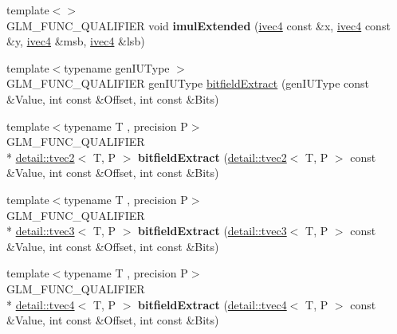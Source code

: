 \begin{DoxyCompactItemize}
\item 
\hypertarget{namespaceglm_a8aa66966beaab138702abc4f469b9839}{{\footnotesize template$<$$>$ }\\G\-L\-M\-\_\-\-F\-U\-N\-C\-\_\-\-Q\-U\-A\-L\-I\-F\-I\-E\-R void {\bfseries imul\-Extended} (\hyperlink{group__core__types_gaa4560ddc50320ea8f8a70d5c9c249fea}{ivec4} const \&x, \hyperlink{group__core__types_gaa4560ddc50320ea8f8a70d5c9c249fea}{ivec4} const \&y, \hyperlink{group__core__types_gaa4560ddc50320ea8f8a70d5c9c249fea}{ivec4} \&msb, \hyperlink{group__core__types_gaa4560ddc50320ea8f8a70d5c9c249fea}{ivec4} \&lsb)}\label{namespaceglm_a8aa66966beaab138702abc4f469b9839}

\item 
{\footnotesize template$<$typename gen\-I\-U\-Type $>$ }\\G\-L\-M\-\_\-\-F\-U\-N\-C\-\_\-\-Q\-U\-A\-L\-I\-F\-I\-E\-R gen\-I\-U\-Type \hyperlink{group__core__func__integer_ga251d309beb171bf95117d2c301b2ad8b}{bitfield\-Extract} (gen\-I\-U\-Type const \&Value, int const \&Offset, int const \&Bits)
\item 
\hypertarget{namespaceglm_ab80cbec6661f19566dafe4d23f997dee}{{\footnotesize template$<$typename T , precision P$>$ }\\G\-L\-M\-\_\-\-F\-U\-N\-C\-\_\-\-Q\-U\-A\-L\-I\-F\-I\-E\-R \\*
\hyperlink{structglm_1_1detail_1_1tvec2}{detail\-::tvec2}$<$ T, P $>$ {\bfseries bitfield\-Extract} (\hyperlink{structglm_1_1detail_1_1tvec2}{detail\-::tvec2}$<$ T, P $>$ const \&Value, int const \&Offset, int const \&Bits)}\label{namespaceglm_ab80cbec6661f19566dafe4d23f997dee}

\item 
\hypertarget{namespaceglm_adcf06c42671bc9aeba477920df26c02e}{{\footnotesize template$<$typename T , precision P$>$ }\\G\-L\-M\-\_\-\-F\-U\-N\-C\-\_\-\-Q\-U\-A\-L\-I\-F\-I\-E\-R \\*
\hyperlink{structglm_1_1detail_1_1tvec3}{detail\-::tvec3}$<$ T, P $>$ {\bfseries bitfield\-Extract} (\hyperlink{structglm_1_1detail_1_1tvec3}{detail\-::tvec3}$<$ T, P $>$ const \&Value, int const \&Offset, int const \&Bits)}\label{namespaceglm_adcf06c42671bc9aeba477920df26c02e}

\item 
\hypertarget{namespaceglm_a7ac7cf2ac2cacd15c4dc19ef3e69fc07}{{\footnotesize template$<$typename T , precision P$>$ }\\G\-L\-M\-\_\-\-F\-U\-N\-C\-\_\-\-Q\-U\-A\-L\-I\-F\-I\-E\-R \\*
\hyperlink{structglm_1_1detail_1_1tvec4}{detail\-::tvec4}$<$ T, P $>$ {\bfseries bitfield\-Extract} (\hyperlink{structglm_1_1detail_1_1tvec4}{detail\-::tvec4}$<$ T, P $>$ const \&Value, int const \&Offset, int const \&Bits)}\label{namespaceglm_a7ac7cf2ac2cacd15c4dc19ef3e69fc07}


\end{DoxyCompactItemize}
